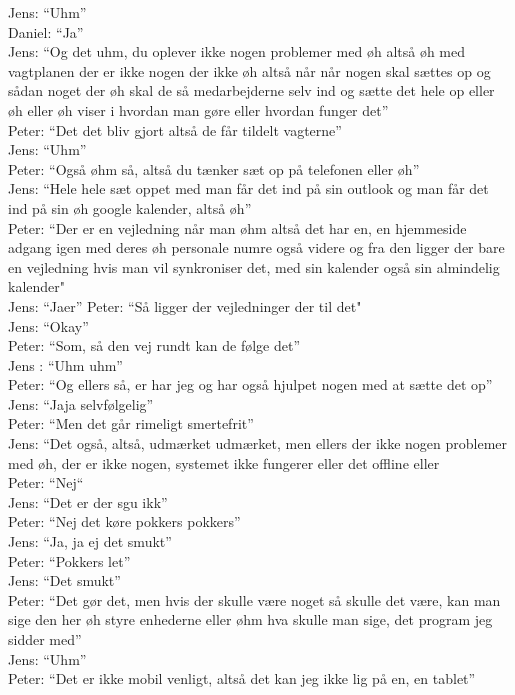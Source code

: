 Jens: “Uhm”\\
Daniel: “Ja”\\
Jens: “Og det uhm, du oplever ikke nogen problemer med øh altså øh med vagtplanen der er ikke nogen der ikke øh altså når når nogen skal sættes op og sådan noget der øh skal de så medarbejderne selv ind og sætte det hele op eller øh eller øh viser i hvordan man gøre eller hvordan funger det”\\
Peter: “Det det bliv gjort altså de får tildelt vagterne”\\
Jens: “Uhm”\\
Peter: “Også øhm så, altså du tænker sæt op på telefonen eller øh”\\
Jens: “Hele hele sæt oppet med man får det ind på sin outlook og man får det ind på sin øh google kalender, altså øh”\\
Peter: “Der er en vejledning når man øhm altså det har en, en hjemmeside adgang igen med deres øh personale numre også videre og fra den ligger der bare en vejledning hvis man vil synkroniser det, med sin kalender også sin almindelig kalender"\\
Jens: “Jaer”
Peter: “Så ligger der vejledninger der til det"\\
Jens: “Okay”\\
Peter: “Som, så den vej rundt kan de følge det”\\
Jens : “Uhm uhm”\\
Peter: “Og ellers så, er har jeg og har også hjulpet nogen med at sætte det op”\\
Jens: “Jaja selvfølgelig”\\
Peter: “Men det går rimeligt smertefrit”\\
Jens: “Det også, altså, udmærket udmærket, men ellers der ikke nogen problemer med øh, der er ikke nogen, systemet ikke fungerer eller det offline eller\\
Peter: “Nej“\\
Jens: “Det er der sgu ikk”\\
Peter: “Nej det køre pokkers pokkers”\\
Jens: “Ja, ja ej det smukt”\\
Peter: “Pokkers let”\\
Jens: “Det smukt”\\
Peter: “Det gør det, men hvis der skulle være noget så skulle det være, kan man sige den her øh styre enhederne eller øhm hva skulle man sige, det program jeg sidder med”\\
Jens: “Uhm”\\
Peter: “Det er ikke mobil venligt, altså det kan jeg ikke lig på en, en tablet”\\
